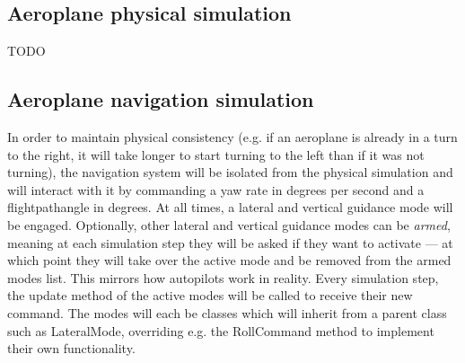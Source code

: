 \documentclass{article}
\begin{document}

\subsection{Aeroplane physical simulation}
TODO


\subsection{Aeroplane navigation simulation}
In order to maintain physical consistency (e.g. if an aeroplane is already in a turn to the right, it will take longer to start turning to the left than if it was not turning), the navigation system will be isolated from the physical simulation and will interact with it by commanding a yaw rate in degrees per second and a \gls{flightpathangle} in degrees.
At all times, a lateral and vertical guidance mode will be engaged.
Optionally, other lateral and vertical guidance modes can be \textit{armed}, meaning at each simulation step they will be asked if they want to activate --- at which point they will take over the active mode and be removed from the armed modes list.
This mirrors how autopilots work in reality.
Every simulation step, the update method of the active modes will be called to receive their new command.
The modes will each be classes which will inherit from a parent class such as LateralMode, overriding e.g. the RollCommand method to implement their own functionality.
\end{document}
